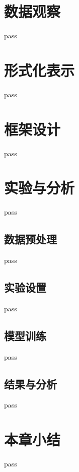 \section{数据观察}
\label{sec:exp_context_emo_data}

pass

\section{形式化表示}
\label{sec:exp_context_emo_format}

pass

\section{框架设计}
\label{sec:exp_context_emo_framework}

pass

\section{实验与分析}
\label{sec:exp_context_emo_exp}

pass

\subsection{数据预处理}

pass

\subsection{实验设置}

pass

\subsection{模型训练}

pass

\subsection{结果与分析}

pass

\section{本章小结}

pass

